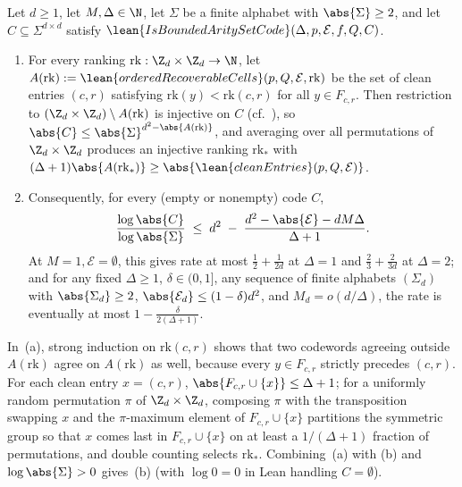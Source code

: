 \begin{theorem}\label{thm:random-order-capacity}
Let $d \ge 1$, let $M, \Delta \in \N$, let $\Sigma$ be a finite alphabet with $\abs{\Sigma} \ge 2$,
and let $C \subseteq \Sigma^{d\times d}$ satisfy
$\lean{IsBoundedAritySetCode}(\Delta, p, \mathcal{E}, f, Q, C)$.
\begin{enumerate}[label=(\alph*)]
\item For every ranking $\mathrm{rk} : \Z_d \times \Z_d \to \N$, let
  $A(\mathrm{rk}) := \lean{orderedRecoverableCells}(p, Q, \mathcal{E}, \mathrm{rk})$ be the set of
  clean entries $(c, r)$ satisfying $\mathrm{rk}(y) < \mathrm{rk}(c, r)$ for all $y \in F_{c,r}$.
  Then restriction to $(\Z_d \times \Z_d) \setminus A(\mathrm{rk})$ is injective on $C$ (cf.\
  ), so
  $\abs{C} \le \abs{\Sigma}^{d^2 - \abs{A(\mathrm{rk})}}$, and averaging over all permutations of
  $\Z_d \times \Z_d$ produces an injective ranking $\mathrm{rk}_*$ with
  $(\Delta + 1)\abs{A(\mathrm{rk}_*)} \ge \abs{\lean{cleanEntries}(p, Q, \mathcal{E})}$.
\item Consequently, for every (empty or nonempty) code $C$,
  \[
    \frac{\log\abs{C}}{\log\abs{\Sigma}}
    \;\le\;
    d^2 \;-\; \frac{d^2 - \abs{\mathcal{E}} - d M \Delta}{\Delta + 1}.
  \]
  At $M = 1, \mathcal{E} = \emptyset$, this gives rate at most $\frac{1}{2} + \frac{1}{2d}$ at
  $\Delta = 1$ and $\frac{2}{3} + \frac{2}{3d}$ at $\Delta = 2$; and for any fixed $\Delta \ge 1$,
  $\delta \in (0, 1]$, any sequence of finite alphabets $(\Sigma_d)$ with $\abs{\Sigma_d} \ge 2$,
  $\abs{\mathcal{E}_d} \le (1 - \delta)d^2$, and $M_d = o(d/\Delta)$, the rate is eventually at most
  $1 - \frac{\delta}{2(\Delta + 1)}$.
\end{enumerate}
\end{theorem}
\begin{outline}
In~(a), strong induction on $\mathrm{rk}(c, r)$ shows that two codewords agreeing outside
$A(\mathrm{rk})$ agree on $A(\mathrm{rk})$ as well, because every $y \in F_{c,r}$ strictly precedes
$(c, r)$. For each clean entry $x = (c, r)$, $\abs{F_{c,r} \cup \{x\}} \le \Delta + 1$; for a
uniformly random permutation $\pi$ of $\Z_d \times \Z_d$, composing $\pi$ with the transposition
swapping $x$ and the $\pi$-maximum element of $F_{c,r} \cup \{x\}$ partitions the symmetric group so
that $x$ comes last in $F_{c,r} \cup \{x\}$ on at least a $1/(\Delta + 1)$ fraction of permutations,
and double counting selects $\mathrm{rk}_*$. Combining~(a) with \Cref{lem:clean-count}(b) and
$\log\abs{\Sigma} > 0$ gives~(b) (with $\log 0 = 0$ in Lean handling $C = \emptyset$).
\end{outline}

